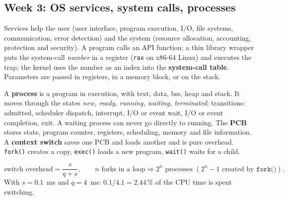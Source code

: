 \documentclass[11pt,a4paper]{article}
\newcommand{\term}[1]{\textbf{\color{mintdeep}#1}}
\newcommand{\cmd}[1]{\texttt{#1}}
\begin{document}
\subsection{Week 3: OS services, system calls, processes}
Services help the user (user interface, program execution, I/O, file systems, communication, error detection) and the system (resource allocation, accounting, protection and security). A program calls an API function; a thin library wrapper puts the system-call \emph{number} in a register (\texttt{rax} on x86-64 Linux) and executes the trap; the kernel uses the number as an index into the \term{system-call table}. Parameters are passed in registers, in a memory block, or on the stack.

A \term{process} is a program in execution, with text, data, bss, heap and stack. It moves through the states \emph{new, ready, running, waiting, terminated}; transitions: admitted, scheduler dispatch, interrupt, I/O or event wait, I/O or event completion, exit. A waiting process can never go directly to running. The \term{PCB} stores state, program counter, registers, scheduling, memory and file information. A \term{context switch} saves one PCB and loads another and is pure overhead. \cmd{fork()} creates a copy, \cmd{exec()} loads a new program, \cmd{wait()} waits for a child.
\begin{example}
\[
\text{switch overhead} = \frac{s}{q + s}, \qquad n \text{ forks in a loop} \Rightarrow 2^{n} \text{ processes } (2^{n}-1 \text{ created by } \cmd{fork()}).
\]
With $s = 0.1$~ms and $q = 4$~ms: $0.1/4.1 = 2.44\,\%$ of the CPU time is spent switching.
\end{example}
\end{document}
